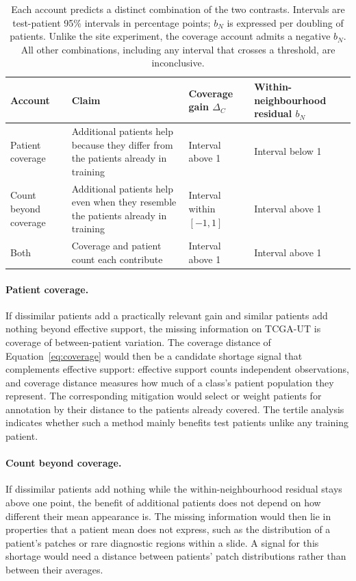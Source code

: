 \documentclass[11pt]{article}
\begin{document}
\begin{table}[htbp]
\centering
\renewcommand{\arraystretch}{1.15}
\begin{tabularx}{\textwidth}{@{}lYYY@{}}
\toprule
Account & Claim & Coverage gain $\Delta_C$ & Within-neighbourhood residual $b_N$ \\
\midrule
Patient coverage & Additional patients help because they differ from the patients already in training & Interval above 1 & Interval below 1 \\
\addlinespace
Count beyond coverage & Additional patients help even when they resemble the patients already in training & Interval within $[-1,1]$ & Interval above 1 \\
\addlinespace
Both & Coverage and patient count each contribute & Interval above 1 & Interval above 1 \\
\bottomrule
\end{tabularx}
\caption{Each account predicts a distinct combination of the two contrasts. Intervals are test-patient 95\% intervals in percentage points; $b_N$ is expressed per doubling of patients. Unlike the site experiment, the coverage account admits a negative $b_N$. All other combinations, including any interval that crosses a threshold, are inconclusive.}
\label{tab:accounts}
\end{table}

\paragraph{Patient coverage.}
If dissimilar patients add a practically relevant gain and similar patients add nothing beyond effective support, the missing information on TCGA-UT is coverage of between-patient variation. The coverage distance of Equation~\eqref{eq:coverage} would then be a candidate shortage signal that complements effective support: effective support counts independent observations, and coverage distance measures how much of a class's patient population they represent. The corresponding mitigation would select or weight patients for annotation by their distance to the patients already covered. The tertile analysis indicates whether such a method mainly benefits test patients unlike any training patient.

\paragraph{Count beyond coverage.}
If dissimilar patients add nothing while the within-neighbourhood residual stays above one point, the benefit of additional patients does not depend on how different their mean appearance is. The missing information would then lie in properties that a patient mean does not express, such as the distribution of a patient's patches or rare diagnostic regions within a slide. A signal for this shortage would need a distance between patients' patch distributions rather than between their averages.
\end{document}
